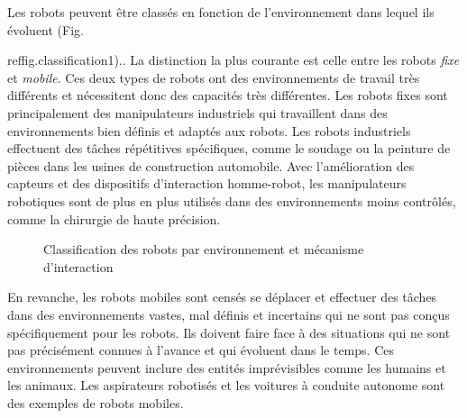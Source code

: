 Les robots peuvent être classés en fonction de l'environnement dans lequel ils évoluent (Fig.~{ref{fig.classification1}).. La distinction la plus courante est celle entre les robots \emph{fixe} et \emph{mobile}. Ces deux types de robots ont des environnements de travail très différents et nécessitent donc des capacités très différentes. Les robots fixes sont principalement des manipulateurs industriels qui travaillent dans des environnements bien définis et adaptés aux robots. Les robots industriels effectuent des tâches répétitives spécifiques, comme le soudage ou la peinture de pièces dans les usines de construction automobile. Avec l'amélioration des capteurs et des dispositifs d'interaction homme-robot, les manipulateurs robotiques sont de plus en plus utilisés dans des environnements moins contrôlés, comme la chirurgie de haute précision.

\begin{figure}
\begin{center}
\end{center}
\caption{Classification des robots par environnement et mécanisme d'interaction}\label{fig.classification1}
\end{figure}

En revanche, les robots mobiles sont censés se déplacer et effectuer des tâches dans des environnements vastes, mal définis et incertains qui ne sont pas conçus spécifiquement pour les robots. Ils doivent faire face à des situations qui ne sont pas précisément connues à l'avance et qui évoluent dans le temps. Ces environnements peuvent inclure des entités imprévisibles comme les humains et les animaux. Les aspirateurs robotisés et les voitures à conduite autonome sont des exemples de robots mobiles. 

}
